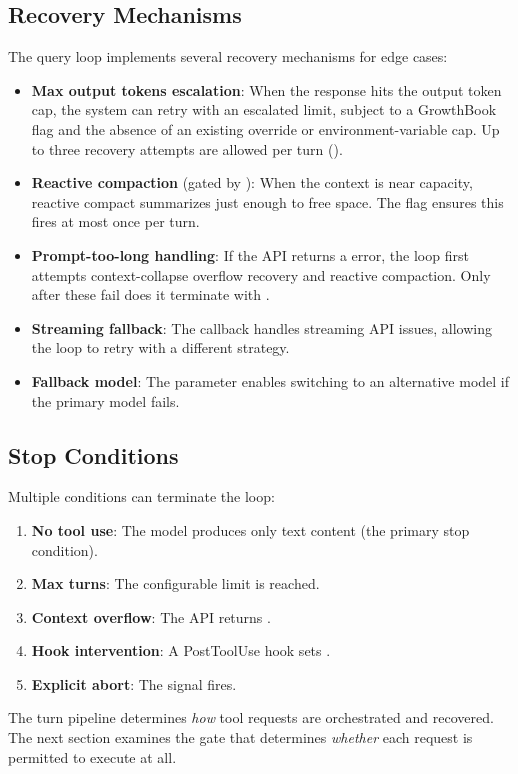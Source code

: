 \subsection{Recovery Mechanisms}
\label{sec:turn:recovery}

The query loop implements several recovery mechanisms for edge cases:

\begin{itemize}[nosep]
  \item \textbf{Max output tokens escalation}: When the response hits the output token cap, the system can retry with an escalated limit, subject to a GrowthBook flag and the absence of an existing override or environment-variable cap. Up to three recovery attempts are allowed per turn ().
  \item \textbf{Reactive compaction} (gated by ): When the context is near capacity, reactive compact summarizes just enough to free space. The  flag ensures this fires at most once per turn.
  \item \textbf{Prompt-too-long handling}: If the API returns a  error, the loop first attempts context-collapse overflow recovery and reactive compaction. Only after these fail does it terminate with .
  \item \textbf{Streaming fallback}: The  callback handles streaming API issues, allowing the loop to retry with a different strategy.
  \item \textbf{Fallback model}: The  parameter enables switching to an alternative model if the primary model fails.
\end{itemize}

\subsection{Stop Conditions}
\label{sec:turn:stop}

Multiple conditions can terminate the loop:

\begin{enumerate}[nosep]
  \item \textbf{No tool use}: The model produces only text content (the primary stop condition).
  \item \textbf{Max turns}: The configurable  limit is reached.
  \item \textbf{Context overflow}: The API returns .
  \item \textbf{Hook intervention}: A PostToolUse hook sets .
  \item \textbf{Explicit abort}: The  signal fires.
\end{enumerate}

The turn pipeline determines \emph{how} tool requests are orchestrated and recovered. The next section examines the gate that determines \emph{whether} each request is permitted to execute at all.


